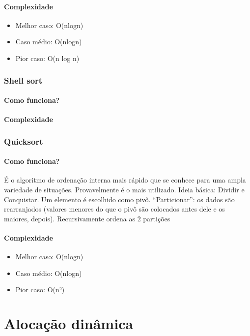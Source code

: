 \documentclass{report}
\begin{document}
	\subsubsection{Complexidade}
	\begin{itemize}
		\item Melhor caso: O(nlogn)
		\item Caso médio: O(nlogn)
		\item Pior caso: O(n log n)
	\end{itemize} 
	\subsection{Shell sort}
	\subsubsection{Como funciona?}
	\subsubsection{Complexidade}

	\subsection{Quicksort}
	\subsubsection{Como funciona?}
	
	É o algoritmo de ordenação interna mais rápido que se conhece para uma ampla variedade de situações. Provavelmente é o mais utilizado. Ideia básica: Dividir e Conquistar. Um elemento é escolhido como pivô. “Particionar”: os dados são rearranjados (valores menores do que o pivô são colocados antes dele e os maiores, depois). Recursivamente ordena as 2 partições
	\subsubsection{Complexidade}
	
	\begin{itemize}
		\item Melhor caso: O(nlogn)
		\item Caso médio: O(nlogn)
		\item Pior caso: O(n²)
	\end{itemize} 
	
	\chapter{Alocação dinâmica}
	
\end{document}
